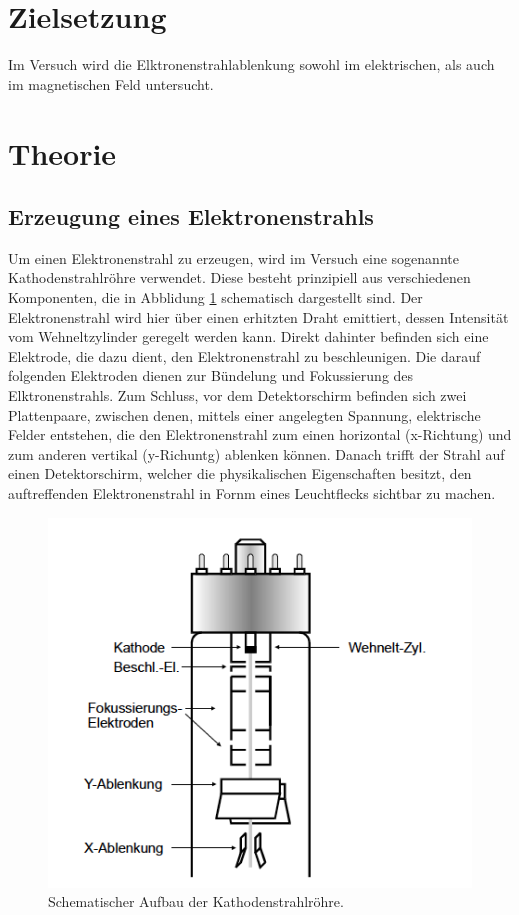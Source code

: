 \section{Zielsetzung}
Im Versuch wird die Elktronenstrahlablenkung sowohl im elektrischen, als auch im
magnetischen Feld untersucht.

\section{Theorie}
\subsection{Erzeugung eines Elektronenstrahls}
Um einen Elektronenstrahl zu erzeugen, wird im Versuch eine sogenannte Kathodenstrahlröhre
verwendet. Diese besteht prinzipiell aus verschiedenen Komponenten, die in Abblidung \ref{abb1}
schematisch dargestellt sind. Der Elektronenstrahl wird hier über einen erhitzten Draht emittiert,
dessen Intensität vom Wehneltzylinder geregelt werden kann. Direkt dahinter befinden sich
eine Elektrode, die dazu dient, den Elektronenstrahl zu beschleunigen. Die darauf folgenden
Elektroden dienen zur Bündelung und Fokussierung des Elktronenstrahls. Zum Schluss,
vor dem Detektorschirm befinden sich zwei Plattenpaare, zwischen denen, mittels einer angelegten
Spannung, elektrische Felder entstehen, die den Elektronenstrahl zum einen horizontal (x-Richtung) und
zum anderen vertikal (y-Richuntg) ablenken können. Danach trifft der Strahl auf einen Detektorschirm, welcher
die physikalischen Eigenschaften besitzt, den auftreffenden Elektronenstrahl in Fornm eines
Leuchtflecks sichtbar zu machen.
\FloatBarrier
\begin{figure}
  \centering
  \includegraphics[scale=0.5]{kanone.PNG}
  \caption{Schematischer Aufbau der Kathodenstrahlröhre. \cite{Q1}}
  \label{abb1}
\end{figure}
\FloatBarrier
